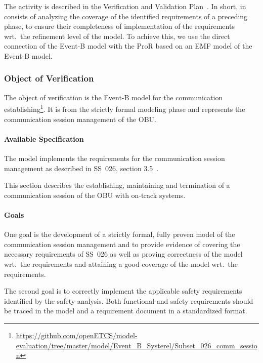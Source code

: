 The activity is described in the Verification and Validation
Plan~\cite{vnvplan}.  In short, in consists of analyzing the coverage of the
identified requirements of a preceding phase, to ensure their completeness of
implementation of the requirements wrt.\ the refinement level of the model. To
achieve this, we use the direct connection of the Event-B model with the ProR
based on an EMF model of the Event-B model.


\subsubsection{Object of Verification}
\label{sec:object-verification}

The object of verification is the Event-B model for the communication
establishing\footnote{\url{https://github.com/openETCS/model-evaluation/tree/master/model/Event_B_Systerel/Subset_026_comm_session}}. It
is from the strictly formal modeling phase and represents the communication
session management of the OBU\@.

\paragraph{Available Specification}
\label{sec:avail-spec}

The model implements the requirements for the communication session management
as described in SS~026, section 3.5~\cite{unisig_subset-026_2012}.

This section describes the establishing, maintaining and termination of a
communication session of the OBU with on-track systems.


\paragraph{Goals}

One goal is the development of a strictly formal, fully proven model of the
communication session management and to provide evidence of covering the
necessary requirements of SS~026 as well as proving correctness of the model
wrt.\ the requirements and attaining a good coverage of the model wrt.\ the
requirements.

The second goal is to correctly implement the applicable safety requirements
identified by the safety analysis. Both functional and safety requirements
should be traced in the model and a requirement document in a standardized
format.

